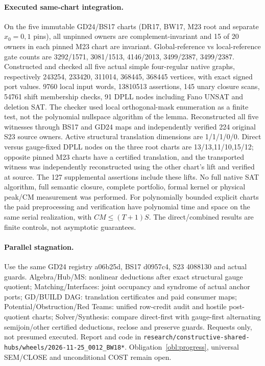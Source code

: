 \documentclass[11pt]{article}
\begin{document}
\paragraph{Executed same-chart integration.}
On the five immutable GD24/BS17 charts (DR17, BW17, M23 root and separate $x_0=0,1$ pins), all unpinned owners are complement-invariant and 15 of 20 owners in each pinned M23 chart are invariant. Global-reference vs local-reference gate counts are 3292/1571, 3081/1513, 4146/2013, 3499/2387, 3499/2387. Constructed and checked all five actual simple four-regular native graphs, respectively 243254, 233420, 311014, 368445, 368445 vertices, with exact signed port values. 9760 local input words, 13810513 assertions, 145 unary closure scans, 54761 shift membership checks, 91 DPLL nodes including Fano UNSAT and deletion SAT. The checker used local orthogonal-mask enumeration as a finite test, not the polynomial nullspace algorithm of the lemma. Reconstructed all five witnesses through BS17 and GD24 maps and independently verified 224 original S23 source owners. Active structural translation dimensions are 1/1/1/0/0. Direct versus gauge-fixed DPLL nodes on the three root charts are 13/13,11/10,15/12; opposite pinned M23 charts have a certified translation, and the transported witness was independently reconstructed using the other chart's lift and verified at source. The 127 supplemental assertions include these lifts. No full native SAT algorithm, full semantic closure, complete portfolio, formal kernel or physical peak/CM measurement was performed. For polynomially bounded explicit charts the paid preprocessing and verification have polynomial time and space on the same serial realization, with $CM\le(T+1)S$. The direct/combined results are finite controls, not asymptotic guarantees.
\paragraph{Parallel stagnation.}
Use the same GD24 registry a06b25d, BS17 d0957c4, S23 4088130 and actual guards. Algebra/Hub/MS: nonlinear deductions after exact structural gauge quotient; Matching/Interfaces: joint occupancy and syndrome of actual anchor ports; GD/BUILD DAG: translation certificates and paid consumer maps; Potential/Obstruction/Red Teams: unified row-credit audit and hostile post-quotient charts; Solver/Synthesis: compare direct-first with gauge-first alternating semijoin/other certified deductions, reclose and preserve guards. Requests only, not presumed executed. Report and code in \texttt{research/constructive-shared-hubs/wheels/2026-11-25\_0012\_BW18*}. Obligation~\ref{obl:progress}, universal SEM/CLOSE and unconditional COST remain open.
\end{document}
